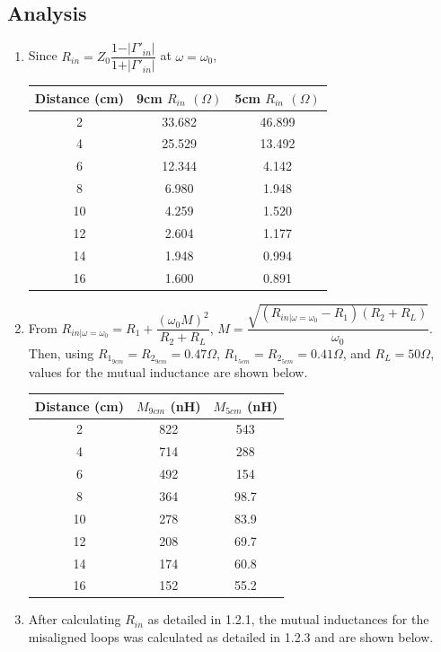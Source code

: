 \documentclass{article}
\begin{document}
\subsection{Analysis}

\begin{enumerate}
	\item Since $R_{in} = Z_0\dfrac{1 - \vert\Gamma '_{in}\vert}{1 + \vert\Gamma'_{in}\vert}$ at $\omega=\omega_0$,
	\begin{table}[H]
	\centering
		\begin{tabular}{|c|c|c|}
		\hline
		Distance (cm) & 9cm $R_{in}$ $(\Omega)$ & 5cm $R_{in}$ $(\Omega)$ \\ \hline
		2  & 33.682 & 46.899 \\ \hline
		4  & 25.529 & 13.492 \\ \hline
		6  & 12.344 & 4.142 \\ \hline
		8  & 6.980 & 1.948 \\ \hline
		10 & 4.259 & 1.520 \\ \hline
		12 & 2.604 & 1.177 \\ \hline
		14 & 1.948 & 0.994 \\ \hline
		16 & 1.600 & 0.891 \\ \hline
		\end{tabular}
	\end{table}
	\item From $R_{in\vert\omega=\omega_0} = R_1 + \dfrac{(\omega_0M)^2}{R_2 + R_L}$, $M = \dfrac{\sqrt{(R_{in\vert\omega=\omega_0} - R_1)(R_2 + R_L)}}{\omega_0}$. Then, using $R_{1_{9cm}} = R_{2_{9cm}} = 0.47 \Omega$, $R_{1_{5cm}} = R_{2_{5cm}} = 0.41 \Omega$, and $R_L = 50\Omega$, values for the mutual inductance are shown below.
	\begin{table}[H]
	\centering
		\begin{tabular}{|c|c|c|}
		\hline
		Distance (cm) & $M_{9cm}$ (nH)& $M_{5cm}$ (nH)\\ \hline
		2  			  & 822 		  & 543  \\ \hline
		4  			  & 714 		  & 288  \\ \hline
		6  			  & 492 		  & 154  \\ \hline
		8  			  & 364 		  & 98.7 \\ \hline
		10 			  & 278 		  & 83.9 \\ \hline
		12 			  & 208 		  & 69.7 \\ \hline
		14 		  	  & 174		   	  & 60.8 \\ \hline
		16 			  & 152 		  & 55.2 \\ \hline
		\end{tabular}
	\end{table}
	\item After calculating $R_{in}$ as detailed in 1.2.1, the mutual inductances for the misaligned loops was calculated as detailed in 1.2.3 and are shown below.
	

\end{enumerate}
\end{document}
